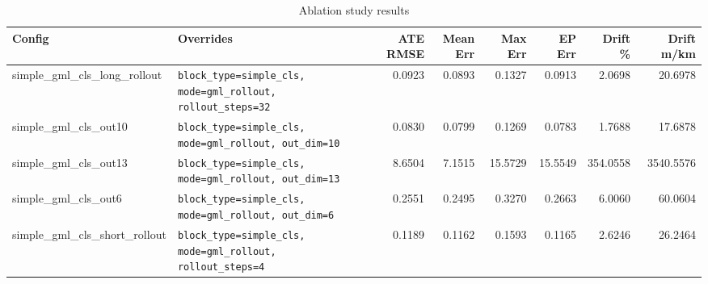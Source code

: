 \begin{table}[ht]
\centering
\caption{Ablation study results}
\label{tab:ablation}
\small
\setlength{\tabcolsep}{4pt}
\begin{tabular}{ll rr rr rr}
\toprule
\textbf{Config} & \textbf{Overrides} &
\textbf{ATE RMSE} & \textbf{Mean Err} &
\textbf{Max Err} & \textbf{EP Err} &
\textbf{Drift \%} & \textbf{Drift m/km} \\
\midrule
simple\_gml\_cls\_long\_rollout & \texttt{block\_type=simple\_cls, mode=gml\_rollout, rollout\_steps=32} & 0.0923 & 0.0893 & 0.1327 & 0.0913 & 2.0698 & 20.6978 \\
simple\_gml\_cls\_out10 & \texttt{block\_type=simple\_cls, mode=gml\_rollout, out\_dim=10} & 0.0830 & 0.0799 & 0.1269 & 0.0783 & 1.7688 & 17.6878 \\
simple\_gml\_cls\_out13 & \texttt{block\_type=simple\_cls, mode=gml\_rollout, out\_dim=13} & 8.6504 & 7.1515 & 15.5729 & 15.5549 & 354.0558 & 3540.5576 \\
simple\_gml\_cls\_out6 & \texttt{block\_type=simple\_cls, mode=gml\_rollout, out\_dim=6} & 0.2551 & 0.2495 & 0.3270 & 0.2663 & 6.0060 & 60.0604 \\
simple\_gml\_cls\_short\_rollout & \texttt{block\_type=simple\_cls, mode=gml\_rollout, rollout\_steps=4} & 0.1189 & 0.1162 & 0.1593 & 0.1165 & 2.6246 & 26.2464 \\
\bottomrule
\end{tabular}
\end{table}
